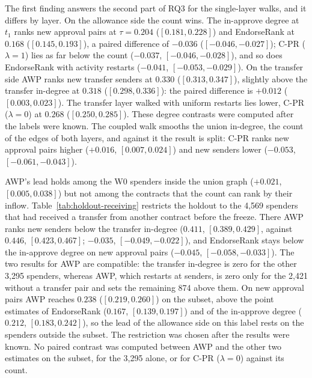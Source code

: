 



The first finding answers the second part of RQ3 for the single-layer walks, and it differs by layer. On the allowance side the count wins. The in-approve degree at $t_1$ ranks new approval pairs at $\tau=0.204$ ($[0.181,0.228]$) and EndorseRank at $0.168$ ($[0.145,0.193]$), a paired difference of $-0.036$ ($[-0.046,-0.027]$); \mbox{C-PR} ($\lambda=1$) lies as far below the count ($-0.037$, $[-0.046,-0.028]$), and so does EndorseRank with activity restarts ($-0.041$, $[-0.053,-0.029]$). On the transfer side AWP ranks new transfer senders at $0.330$ ($[0.313,0.347]$), slightly above the transfer in-degree at $0.318$ ($[0.298,0.336]$): the paired difference is $+0.012$ ($[0.003,0.023]$). The transfer layer walked with uniform restarts lies lower, \mbox{C-PR} ($\lambda=0$) at $0.268$ ($[0.250,0.285]$). These degree contrasts were computed after the labels were known. The coupled walk smooths the union in-degree, the count of the edges of both layers, and against it the result is split: \mbox{C-PR} ranks new approval pairs higher ($+0.016$, $[0.007,0.024]$) and new senders lower ($-0.053$, $[-0.061,-0.043]$).

AWP's lead holds among the W0 spenders inside the union graph ($+0.021$, $[0.005,0.038]$) but not among the contracts that the count can rank by their inflow. Table~\ref{tab:holdout-receiving} restricts the holdout to the 4,569 spenders that had received a transfer from another contract before the freeze. There AWP ranks new senders below the transfer in-degree ($0.411$, $[0.389,0.429]$, against $0.446$, $[0.423,0.467]$; $-0.035$, $[-0.049,-0.022]$), and EndorseRank stays below the in-approve degree on new approval pairs ($-0.045$, $[-0.058,-0.033]$). The two results for AWP are compatible: the transfer in-degree is zero for the other 3,295 spenders, whereas AWP, which restarts at senders, is zero only for the 2,421 without a transfer pair and sets the remaining 874 above them. On new approval pairs AWP reaches $0.238$ ($[0.219,0.260]$) on the subset, above the point estimates of EndorseRank ($0.167$, $[0.139,0.197]$) and of the in-approve degree ($0.212$, $[0.183,0.242]$), so the lead of the allowance side on this label rests on the spenders outside the subset. The restriction was chosen after the results were known. No paired contrast was computed between AWP and the other two estimates on the subset, for the 3,295 alone, or for \mbox{C-PR} ($\lambda=0$) against its count.

